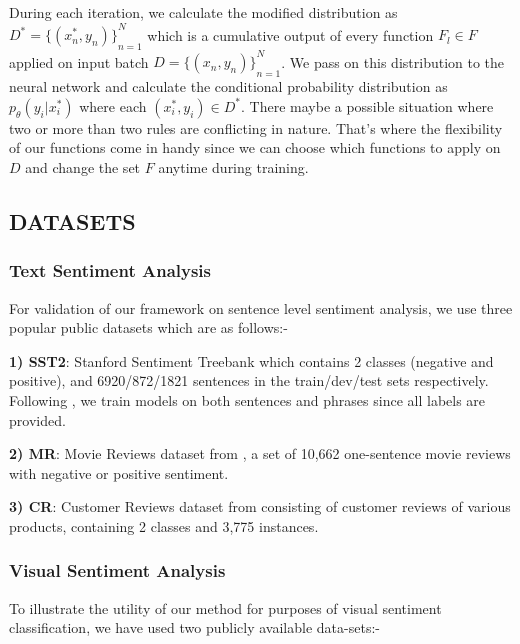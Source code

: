 \documentclass[12pt,a4paper]{article}
\begin{document}
During each iteration, we calculate the modified distribution
as \begin{math} D^* = {\{ (x_n^*,y_n) \}}_{n=1}^N\end{math} which is a cumulative output of every function \begin{math}F_l \in F\end{math} applied on input batch \begin{math} D = {\{ (x_n,y_n) \}}_{n=1}^N\end{math}. We pass on this distribution to the neural network and calculate the conditional probability distribution as $p_\theta(y_i|x_i^*)$ where each \begin{math}(x_i^*,y_i) \in D^*\end{math}. There maybe a possible situation where two or
more than two rules are conflicting in nature. That’s where
the flexibility of our functions come in handy since we can
choose which functions to apply on $D$ and change the set $F$
anytime during training.

\subsection{DATASETS}
\subsubsection{\large{Text Sentiment Analysis}}
For validation of our framework on sentence level sentiment analysis, we use three popular public datasets which are as follows:-
\vspace{2mm}

\textbf{1) SST2}: Stanford Sentiment Treebank \cite{Socher:2014} which contains 2 classes (negative and positive), and 6920/872/1821 sentences in the train/dev/test sets respectively. Following \cite{Kim:2014}, we train models on both sentences and phrases since all labels are provided. 

\textbf{2) MR}: Movie Reviews dataset from \cite{Pang-Lee:2005}, a set of 10,662 one-sentence movie reviews with negative or positive sentiment. 

\textbf{3) CR}: Customer Reviews dataset from \cite{Hu-and-Liu:2004} consisting of customer reviews of various products, containing 2 classes and 3,775 instances.
\vspace{2mm}

\subsubsection{\large{Visual Sentiment Analysis}}
To illustrate the utility of our method for purposes of visual sentiment classification, we have used two publicly available data-sets:-
\end{document}
